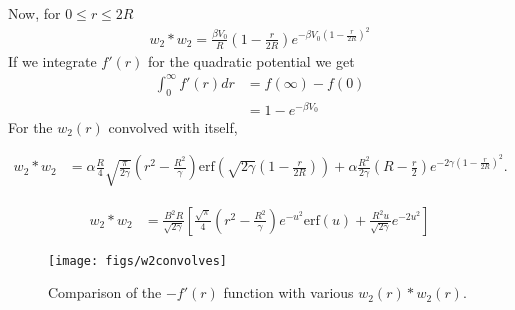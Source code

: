 \documentclass[letterpaper,twocolumn,amsmath,amssymb,prb]{revtex4-1}
\begin{document}
Now, for $ 0 \leq r \leq 2R$
\begin{align}
  w_2 \ast w_2 = \frac{\beta V_0}{R} \left( 1 - \frac{r}{2R} \right)
              e^{-\beta V_0 \left( 1 - \frac{r}{2R} \right)^2}
\end{align}
If we integrate $f'(r)$ for the quadratic potential we get
\begin{align}
  \int_0^{\infty} f'(r)dr &= f(\infty) - f(0)\\
                    &= 1 - e^{-\beta V_0}
\end{align}
For the $w_2(r)$ convolved with itself,
\begin{widetext}
\begin{align*}
  w_2\ast w_2 &= \alpha \frac{R}{4}\sqrt{\frac{\pi}{2\gamma}}
               \left( r^2 - \frac{R^2}{\gamma}
               \right)\textrm{erf} \left( \sqrt{2\gamma} \left(1 - \frac{r}{2R}
               \right) \right)%
               + \alpha \frac{R^2}{2\gamma} \left( R - \frac{r}{2}
               \right) e^{-2\gamma \left( 1 - \frac{r}{2R} \right)^2}.
\end{align*}
\end{widetext}
\begin{align*}
  w_2\ast w_2 &= \frac{B^2 R}{\sqrt{2\gamma}} \left[
               \frac{\sqrt{\pi}}{4} \left( r^2 - \frac{R^2}{\gamma}
               \right) e^{-u^2} \textrm{erf}(u)
               + \frac{R^2 u}{\sqrt{2\gamma}}
               e^{-2u^2} \right]
\end{align*}

\begin{figure}
\begin{center}
\texttt{[image: figs/w2convolves]}
\end{center}
\caption{Comparison of the $-f'(r)$ function with various $w_2(r)\ast
  w_2(r)$.}
\label{fig:w2convolves}
\end{figure}
\end{document}
